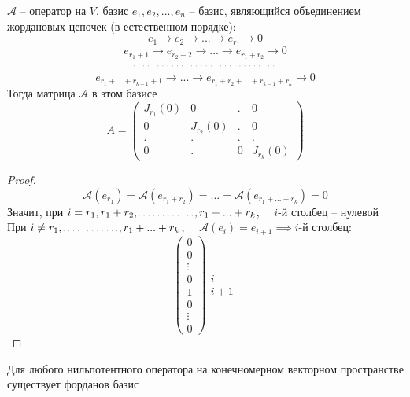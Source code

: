 \begin{lemma}
	$ \mathcal{A} $ -- оператор на $ V $, базис $ e_1, e_2, ..., e_n $ -- базис, являющийся объединением жордановых цепочек (в естественном порядке):
	$$ e_1 \to e_2 \to ... \to e_{r_1} \to 0 $$
	$$ e_{r_1 + 1} \to e_{r_2 + 2} \to ... \to e_{r_1 + r_2} \to 0 $$
	$$ \widedots $$
	$$ e_{r_1 + ... + r_{k - 1} + 1} \to ... \to e_{r_1 + r_2 + ... + r_{k - 1} + r_k} \to 0 $$
	Тогда матрица $ \mathcal{A} $ в этом базисе
	$$ A =
	\begin{pmatrix}
		J_{r_1}(0) & 0 & . & 0 \\
		0 & J_{r_2}(0) & . & 0 \\
		. & . & . & . \\
		0 & . & 0 & J_{r_k}(0)
	\end{pmatrix} $$
\end{lemma}

\begin{proof}
	$$ \mathcal{A}(e_{r_1}) = \mathcal{A}(e_{r_1 + r_2}) = ... = \mathcal{A}(e_{r_1 + ... + r_k}) = 0 $$
	Значит, при $ i = r_1, r_1 + r_2, \widedots[5em], r_1 + ... + r_k $, $ \quad i $-й столбец -- нулевой \\
	При $ i \ne r_1, \widedots[5em], r_1 + ... + r_k $, $ \quad \mathcal{A}(e_i) = e_{i + 1} \implies i $-й столбец:
	$$
	\begin{pmatrix}
		0 \\
		0 \\
		\vdots \\
		0 \\
		1 \\
		0 \\
		\vdots \\
		0
	\end{pmatrix}
	\begin{matrix}
		\ \\
		\ \\
		\ \\
		i \\
		i + 1 \\
		\ \\
		\ \\
		\
	\end{matrix} $$
\end{proof}

\begin{theorem}
	Для любого нильпотентного оператора на конечномерном векторном пространстве существует форданов базис
\end{theorem}

